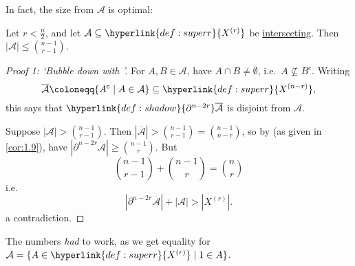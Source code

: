 \documentclass{article}
\newcommand{\A}{\mathcal{A}}
\let\subset\subseteq
\begin{document}
In fact, the size from $\A$ is optimal:
\begin{nthm}\label{thm:ekr11}
  Let $r < \frac{n}{2}$, and let $\A \subset \hyperlink{def:superr}{X^{(r)}}$ be \hyperlink{def:inter}{intersecting}.
  Then $|\A| \leq \binom{n-1}{r-1}$.
\end{nthm}
\begin{proof}[Proof 1: `Bubble down with ']
  For $A,B \in \A$, have $A \cap B \neq \emptyset$, i.e.\ $A \nsubseteq B^c$.
  Writing
  \begin{equation*}\overline{\A} \coloneqq \{A^c \mid A \in \A\} \subset \hyperlink{def:superr}{X^{(n-r)}},\end{equation*}
  this says that $\hyperlink{def:shadow}{\partial^{n-2r}} \overline{\A}$ is disjoint from $\A$.
  \begin{center}
  \end{center}
  Suppose $|\A| > \binom{n-1}{r-1}$.
  Then $|\overline{\A}| > \binom{n-1}{r-1} = \binom{n-1}{n-r}$, so by  (as given in \cref{cor:1.9}), have $|\partial^{n-2r} \overline{\A}| \geq \binom{n-1}{r}$.
  But
  \begin{equation*}
    \binom{n-1}{r-1} + \binom{n-1}{r} = \binom{n}{r}
  \end{equation*}
  i.e.\
  \begin{equation*}
    |\partial^{n-2r} \overline{\A}| + |\A| > |X^{(r)}|.
  \end{equation*}
  a contradiction.
\end{proof}
\begin{remark}
  The numbers \emph{had} to work, as we get equality for $\A = \{A \in \hyperlink{def:superr}{X^{(r)}} \mid 1 \in A\}$.
\end{remark}
\end{document}
